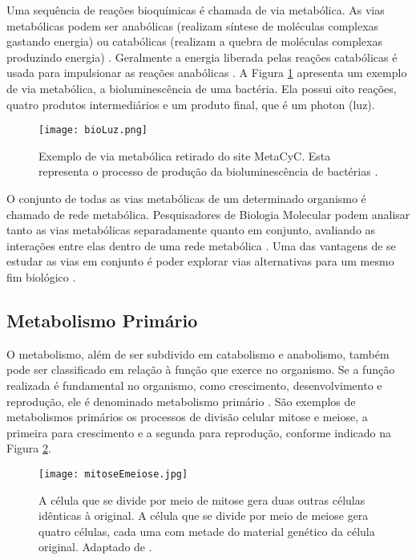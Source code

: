 \indent Uma sequência de reações bioquímicas é chamada de via metabólica. As vias metabólicas podem ser anabólicas (realizam síntese de moléculas complexas gastando energia) ou catabólicas (realizam a quebra de moléculas complexas produzindo energia) \cite{lacroixCTS08}. Geralmente a energia liberada pelas reações catabólicas é usada para impulsionar as reações anabólicas \cite{carterClass}. A Figura \ref{fig:bioLuz} apresenta um exemplo de via metabólica, a bioluminescência de uma bactéria. Ela possui oito reações, quatro produtos intermediários e um produto final, que é um photon (luz).

\begin{figure}[h]
    \centering
    \texttt{[image: bioLuz.png]}
    \caption{Exemplo de via metabólica retirado do site MetaCyC. Esta representa o processo de produção da bioluminescência de bactérias \cite{examplePathway}. }
    \label{fig:bioLuz}
\end{figure}

\indent O conjunto de todas as vias metabólicas de um determinado organismo é chamado de rede metabólica. Pesquisadores de Biologia Molecular podem analisar tanto as vias metabólicas separadamente quanto em conjunto, avaliando as interações entre elas dentro de uma rede metabólica \cite{lacroixCTS08}. Uma das vantagens de se estudar as vias em conjunto é poder explorar vias alternativas para um mesmo fim biológico \cite{lacroixCTS08}.

\subsection{Metabolismo Primário}

\indent O metabolismo, além de ser subdivido em catabolismo e anabolismo, também pode ser classificado em relação à função que exerce no organismo. Se a função realizada é fundamental no organismo, como crescimento, desenvolvimento e reprodução, ele é denominado metabolismo primário \cite{Cap3schomburg}. São exemplos de metabolismos primários os processos de divisão celular mitose e meiose, a primeira para crescimento e a segunda para reprodução, conforme indicado na Figura \ref{fig:mitoseEmeiose}.

\begin{figure}[h]
    \centering
    \texttt{[image: mitoseEmeiose.jpg]}
    \caption{A célula que se divide por meio de mitose gera duas outras células idênticas à original. A célula que se divide por meio de meiose gera quatro células, cada uma com metade do material genético da célula original. Adaptado de \cite{mitoseMeiose}. }
    \label{fig:mitoseEmeiose}
\end{figure} 

